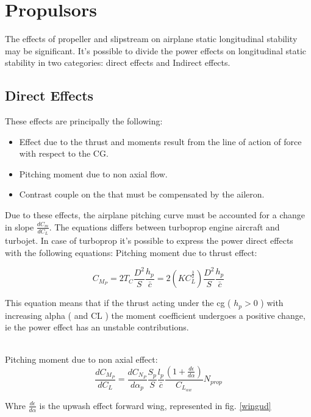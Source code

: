 \section{Propulsors}

The effects of propeller and slipstream on airplane static longitudinal stability may be significant. It's possible to divide the power effects on longitudinal static stability in two categories: direct effects and
Indirect effects.
\subsection{Direct Effects}
 These effects are principally the following:
\begin{itemize}
\item  Effect due to the thrust and moments result from the line of action of force with respect to the CG.
\item Pitching moment due to non axial flow.
\item Contrast couple on the that must be compensated by the aileron.
\end{itemize}

Due to these effects, the airplane pitching curve must be accounted for a change in slope $\frac{dC_m}{dC_L}$. The equations differs between turboprop engine aircraft and turbojet. In case of turboprop it's possible to express the power direct effects with the following equations:
Pitching moment due to thrust effect:

\begin{equation}
C_{M_P} = 2 T_C \frac{D^2}{S} \frac{h_p}{\bar c} = 2 (K C_L^{\frac{3}{2}}) \frac{D^2}{S} \frac{h_p}{\bar c} 
\end{equation}

This equation means that if the thrust acting under the cg ( $h_p > 0$ ) with increasing alpha ( and CL ) the moment coefficient undergoes a positive change, ie the power effect has an unstable contributions.

\noindent \\
Pitching moment due to non axial effect:
\begin{equation}
\frac{dC_{M_P}}{dC_L} = \frac{dC_{N_P}}{d\alpha_p} \frac{S_p}{S} \frac{l_p}{\bar c} \frac{ \left ( 1 + \frac{d \epsilon}{d \alpha} \right )}{C_{L_{\alpha w}}} N_{prop}
\end{equation}

Whre $\frac{d \epsilon}{d \alpha}$ is the upwash effect forward wing, represented in fig. \ref {wingud}

